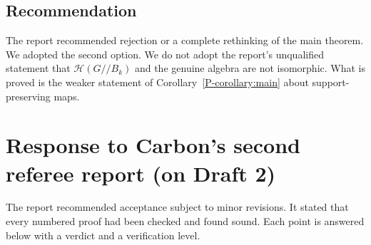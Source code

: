 \documentclass[12pt,letterpaper]{amsart}
\newcommand{\cH}{\mathcal{H}}
\begin{document}
\subsection*{Recommendation}
The report recommended rejection or a complete rethinking of the main
theorem. We adopted the second option. We do not adopt the report's
unqualified statement that $\cH(G/\!/B_k)$ and the genuine algebra are
not isomorphic. What is proved is the weaker statement of
Corollary~\ref{P-corollary:main} about support-preserving maps.

\section{Response to Carbon's second referee report (on Draft 2)}
\label{sec:referee2}

The report recommended acceptance subject to minor revisions. It
stated that every numbered proof had been checked and found sound. Each
point is answered below with a verdict and a verification level.
\end{document}
